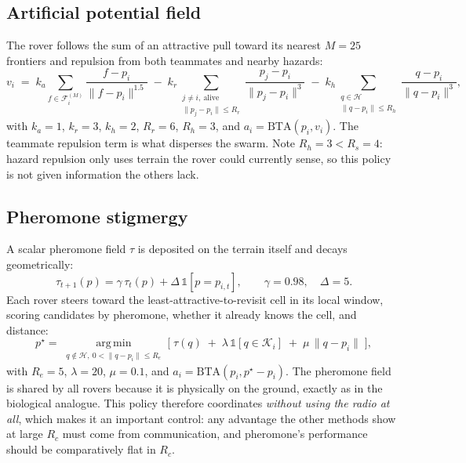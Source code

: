 \documentclass[11pt]{article}
\begin{document}
\subsection{Artificial potential field}

The rover follows the sum of an attractive pull toward its nearest
$M=25$ frontiers and repulsion from both teammates and nearby hazards:
\begin{equation}
v_i \;=\;
  k_a \!\!\sum_{f \in \mathcal{F}_i^{(M)}}\!\! \frac{f - p_i}{\lVert f - p_i \rVert^{1.5}}
  \;-\; k_r \!\!\!\sum_{\substack{j \ne i,\ \text{alive} \\ \lVert p_j - p_i \rVert \le R_r}}\!\!\! \frac{p_j - p_i}{\lVert p_j - p_i \rVert^{3}}
  \;-\; k_h \!\!\!\sum_{\substack{q \in \mathcal{H} \\ \lVert q - p_i \rVert \le R_h}}\!\!\! \frac{q - p_i}{\lVert q - p_i \rVert^{3}},
\label{eq:apf}
\end{equation}
with $k_a = 1$, $k_r = 3$, $k_h = 2$, $R_r = 6$, $R_h = 3$, and
$a_i = \mathrm{BTA}(p_i, v_i)$. The teammate repulsion term is what disperses
the swarm. Note $R_h = 3 < R_s = 4$: hazard repulsion only uses terrain the
rover could currently sense, so this policy is not given information the others
lack.

\subsection{Pheromone stigmergy}

A scalar pheromone field $\tau$ is deposited on the terrain itself and decays
geometrically:
\begin{equation}
\tau_{t+1}(p) = \gamma\,\tau_t(p) + \Delta\,\mathbb{1}[p = p_{i,t}],
\qquad \gamma = 0.98,\quad \Delta = 5 .
\end{equation}
Each rover steers toward the least-attractive-to-revisit cell in its local
window, scoring candidates by pheromone, whether it already knows the cell, and
distance:
\begin{equation}
p^\star = \operatorname*{arg\,min}_{\substack{q \notin \mathcal{H},\ 0 < \lVert q - p_i \rVert \le R_e}}
  \Big[\; \tau(q) \;+\; \lambda\,\mathbb{1}[q \in \mathcal{K}_i] \;+\; \mu\,\lVert q - p_i \rVert \;\Big],
\end{equation}
with $R_e = 5$, $\lambda = 20$, $\mu = 0.1$, and
$a_i = \mathrm{BTA}(p_i, p^\star - p_i)$. The pheromone field is shared by all
rovers because it is physically on the ground, exactly as in the biological
analogue. This policy therefore coordinates \emph{without using the radio at
all}, which makes it an important control: any advantage the other methods show
at large $R_c$ must come from communication, and pheromone's performance should
be comparatively flat in $R_c$.
\end{document}
